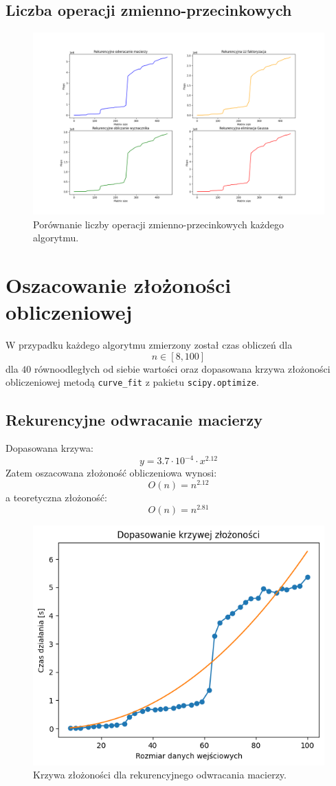 \documentclass[11pt, leqno]{scrartcl}
\begin{document}
    \subsection{Liczba operacji zmienno-przecinkowych}
    \begin{figure}[H]
        \centering
        \includegraphics[width=0.8\linewidth]{zad2_flops2.png}
        \caption{Porównanie liczby operacji zmienno-przecinkowych
            każdego algorytmu.}
    \end{figure}

    \section{Oszacowanie złożoności obliczeniowej}
    W przypadku każdego algorytmu zmierzony został czas obliczeń dla
    \[
        n \in [8,100]
    \]
    dla $40$ równoodległych od siebie wartości oraz dopasowana krzywa
    złożoności obliczeniowej metodą \texttt{curve\_fit} z pakietu
    \texttt{scipy.optimize}.

    \subsection{Rekurencyjne odwracanie macierzy}
    Dopasowana krzywa:
    \[
        y=3.7 \cdot 10^{-4} \cdot x^{2.12}
    \]
    Zatem oszacowana złożoność obliczeniowa wynosi:
    \[
        O(n)=n^{2.12}
    \]
    a teoretyczna złożoność:
    \[
        O(n)=n^{2.81}
    \]
    \begin{figure}[H]
        \centering
        \includegraphics[width=0.7\linewidth]{zlozonosc_rek_mnozenie.png}
        \caption{Krzywa złożoności dla rekurencyjnego odwracania macierzy.}
    \end{figure}
\end{document}
